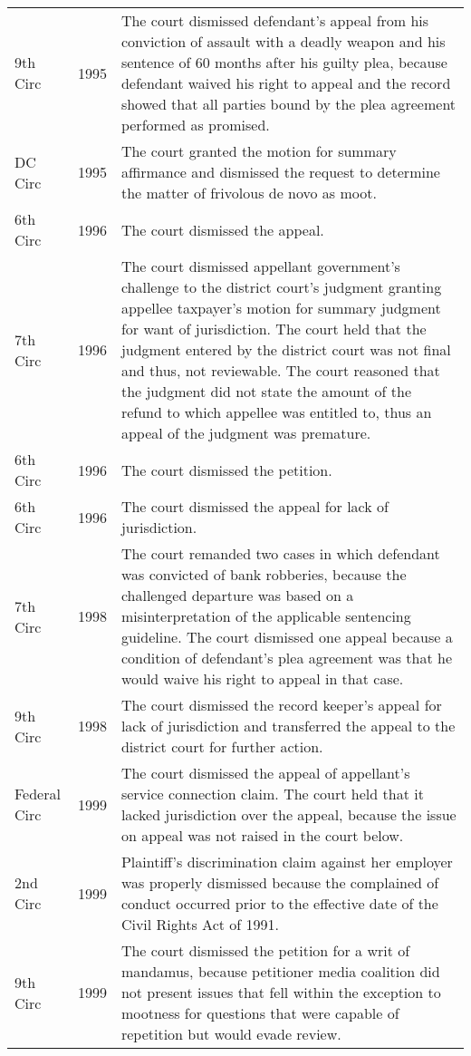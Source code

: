 \documentclass[10pt, letterpaper]{article}
\begin{document}
\begin{spacing}{1.0}
\begin{small}
\begin{longtable}[H]{llp{5in}}
    9th Circ & 1995 & The court dismissed defendant's appeal from his conviction of assault with a deadly weapon and his sentence of 60 months after his guilty plea, because defendant waived his right to appeal and the record showed that all parties bound by the plea agreement performed as promised.\\[4pt]
    DC Circ & 1995 & The court granted the motion for summary affirmance and dismissed the request to determine the matter of frivolous de novo as moot.\\[4pt]
    6th Circ & 1996 & The court dismissed the appeal.\\[4pt]
    7th Circ & 1996 & The court dismissed appellant government's challenge to the district court's judgment granting appellee taxpayer's motion for summary judgment for want of jurisdiction. The court held that the judgment entered by the district court was not final and thus, not reviewable. The court reasoned that the judgment did not state the amount of the refund to which appellee was entitled to, thus an appeal of the judgment was premature.\\[4pt]
    6th Circ & 1996 & The court dismissed the petition.\\[4pt]
    6th Circ & 1996 & The court dismissed the appeal for lack of jurisdiction.\\[4pt]
    7th Circ & 1998 & The court remanded two cases in which defendant was convicted of bank robberies, because the challenged departure was based on a misinterpretation of the applicable sentencing guideline. The court dismissed one appeal because a condition of defendant's plea agreement was that he would waive his right to appeal in that case.\\[4pt]
    9th Circ & 1998 & The court dismissed the record keeper's appeal for lack of jurisdiction and transferred the appeal to the district court for further action.\\[4pt]
    Federal Circ & 1999 & The court dismissed the appeal of appellant's service connection claim. The court held that it lacked jurisdiction over the appeal, because the issue on appeal was not raised in the court below.\\[4pt]
    2nd Circ & 1999 & Plaintiff's discrimination claim against her employer was properly dismissed because the complained of conduct occurred prior to the effective date of the Civil Rights Act of 1991.\\[4pt]
    9th Circ & 1999 & The court dismissed the petition for a writ of mandamus, because petitioner media coalition did not present issues that fell within the exception to mootness for questions that were capable of repetition but would evade review.\\[4pt]

\end{longtable}
\end{small}
\end{spacing}
\end{document}
